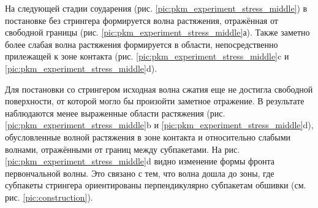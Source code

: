 На следующей стадии соударения (рис. \ref{pic:pkm_experiment_stress_middle}) в постановке без стрингера формируется волна растяжения, отражённая от свободной границы (рис. \ref{pic:pkm_experiment_stress_middle}а). Также заметно более слабая волна растяжения формируется в области, непосредственно прилежащей к зоне контакта (рис. \ref{pic:pkm_experiment_stress_middle}c и \ref{pic:pkm_experiment_stress_middle}d).

Для постановки со стрингером исходная волна сжатия еще не достигла свободной поверхности, от которой могло бы произойти заметное отражение. В результате наблюдаются менее выраженные области растяжения (рис. \ref{pic:pkm_experiment_stress_middle}b и \ref{pic:pkm_experiment_stress_middle}d), обусловленные волной растяжения в зоне контакта и относительно слабыми волнами, отражёнными от границ между субпакетами. На рис. \ref{pic:pkm_experiment_stress_middle}d видно изменение формы фронта первончальной волны. Это связано с тем, что волна дошла до зоны, где субпакеты стрингера ориентированы перпендикулярно субпакетам обшивки (см. рис. \ref{pic:construction}).

